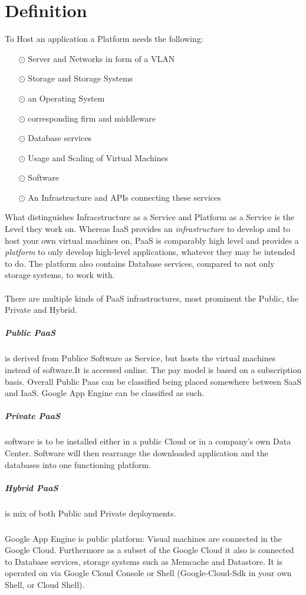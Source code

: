 \documentclass{article}
\begin{document}
\section{Definition}
To Host an application a Platform needs the following: \\
\begin{itemize}
	\item[$\odot$] Server and Networks in form of a VLAN
	\item[$\odot$] Storage and Storage Systems
	\item[$\odot$] an Operating System
	\item[$\odot$] corresponding firm  and middleware
	\item[$\odot$] Database services
	\item[$\odot$] Usage and Scaling of Virtual Machines
	\item[$\odot$] Software
	\item[$\odot$] An Infrastructure and APIs connecting these services
\end{itemize}
What distinguishes Infracstructure as a Service and Platform as a Service is the Level they work on. Whereas IaaS provides an \textit{infrastructure} to develop and to host your own virtual machines on, PaaS is comparably high level and provides a \textit{platform} to only develop high-level applications, whatever they may be intended to do. The platform also contains Database services, compared to not only storage systems, to work with.\\ \ \\
 There are multiple kinds of PaaS infrastructures, most prominent the Public, the Private and Hybrid.
\subparagraph*{Public PaaS}is derived from Publice Software as Service, but hosts the virtual machines instead of software.It is accessed online. The pay model is based on a subscription basis. Overall Public Paas can be classified being placed somewhere between SaaS and IaaS. Google App Engine can be classified as such.

\subparagraph*{Private PaaS}
 software is to be installed either in a public Cloud or in a company's own Data Center. Software will then rearrange the downloaded application and the databases into one functioning platform.

\subparagraph*{Hybrid PaaS } is mix of both Public and Private deployments.

\subparagraph*{}
Google App Engine is public  platform: Visual machines are connected in the Google Cloud. Furthermore as a subset of the Google Cloud it also is connected to Database services, storage systems such as Memcache and  Datastore. It is operated on via Google Cloud Console or Shell (Google-Cloud-Sdk in your own Shell, or Cloud Shell).
\end{document}
